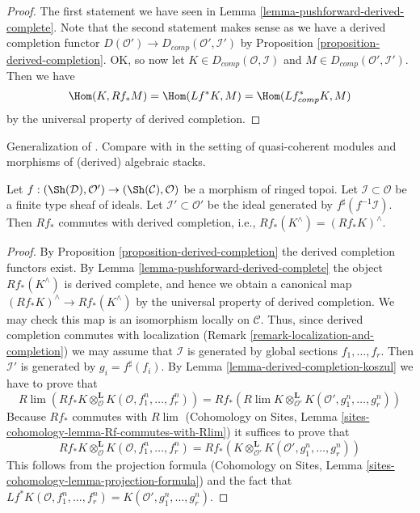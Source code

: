 \begin{proof}
The first statement we have seen in
Lemma \ref{lemma-pushforward-derived-complete}.
Note that the second statement makes sense as we have a derived
completion functor $D(\mathcal{O}') \to D_{comp}(\mathcal{O}', \mathcal{I}')$
by Proposition \ref{proposition-derived-completion}.
OK, so now let $K \in D_{comp}(\mathcal{O}, \mathcal{I})$
and $M \in D_{comp}(\mathcal{O}', \mathcal{I}')$. Then we have
$$
\Hom(K, Rf_*M) = \Hom(Lf^*K, M) = \Hom(Lf_{comp}^*K, M)
$$
by the universal property of derived completion.
\end{proof}

\begin{lemma}
\label{lemma-pushforward-commutes-with-derived-completion}
\begin{reference}
Generalization of \cite[Lemma 6.5.9 (2)]{BS}. Compare with
\cite[Theorem 6.5]{HL-P} in the setting of quasi-coherent modules
and morphisms of (derived) algebraic stacks.
\end{reference}
Let $f : (\Sh(\mathcal{D}), \mathcal{O}') \to (\Sh(\mathcal{C}), \mathcal{O})$
be a morphism of ringed topoi. Let $\mathcal{I} \subset \mathcal{O}$
be a finite type sheaf of ideals. Let $\mathcal{I}' \subset \mathcal{O}'$
be the ideal generated by $f^\sharp(f^{-1}\mathcal{I})$.
Then $Rf_*$ commutes with derived completion, i.e.,
$Rf_*(K^\wedge) = (Rf_*K)^\wedge$.
\end{lemma}

\begin{proof}
By Proposition \ref{proposition-derived-completion} the derived completion
functors exist. By Lemma \ref{lemma-pushforward-derived-complete} the object
$Rf_*(K^\wedge)$ is derived complete, and hence we obtain a canonical map
$(Rf_*K)^\wedge \to Rf_*(K^\wedge)$ by the universal property of derived
completion. We may check this map is an isomorphism locally on $\mathcal{C}$.
Thus, since derived completion commutes with localization
(Remark \ref{remark-localization-and-completion}) we may assume
that $\mathcal{I}$ is generated by global sections $f_1, \ldots, f_r$.
Then $\mathcal{I}'$ is generated by $g_i = f^\sharp(f_i)$. By
Lemma \ref{lemma-derived-completion-koszul}
we have to prove that
$$
R\lim \left(
Rf_*K \otimes^\mathbf{L}_\mathcal{O} K(\mathcal{O}, f_1^n, \ldots, f_r^n)
\right)
=
Rf_*\left(
R\lim
K \otimes^\mathbf{L}_{\mathcal{O}'} K(\mathcal{O}', g_1^n, \ldots, g_r^n)
\right)
$$
Because $Rf_*$ commutes with $R\lim$
(Cohomology on Sites, Lemma
\ref{sites-cohomology-lemma-Rf-commutes-with-Rlim})
it suffices to prove that
$$
Rf_*K \otimes^\mathbf{L}_\mathcal{O} K(\mathcal{O}, f_1^n, \ldots, f_r^n) =
Rf_*\left(
K \otimes^\mathbf{L}_{\mathcal{O}'} K(\mathcal{O}', g_1^n, \ldots, g_r^n)
\right)
$$
This follows from the projection formula (Cohomology on Sites, Lemma
\ref{sites-cohomology-lemma-projection-formula}) and the fact that
$Lf^*K(\mathcal{O}, f_1^n, \ldots, f_r^n) =
K(\mathcal{O}', g_1^n, \ldots, g_r^n)$.
\end{proof}




